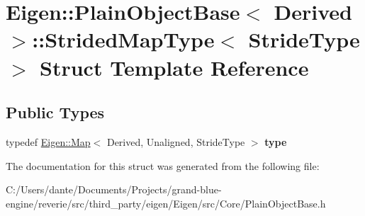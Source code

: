 \hypertarget{struct_eigen_1_1_plain_object_base_1_1_strided_map_type}{}\section{Eigen\+::Plain\+Object\+Base$<$ Derived $>$\+::Strided\+Map\+Type$<$ Stride\+Type $>$ Struct Template Reference}
\label{struct_eigen_1_1_plain_object_base_1_1_strided_map_type}
\subsection*{Public Types}
\begin{DoxyCompactItemize}
\item 
\mbox{\label{struct_eigen_1_1_plain_object_base_1_1_strided_map_type_a63eeb7d4d8aefb9904a7de79f640648e}} 
typedef \mbox{\hyperlink{class_eigen_1_1_map}{Eigen\+::\+Map}}$<$ Derived, Unaligned, Stride\+Type $>$ {\bfseries type}
\end{DoxyCompactItemize}


The documentation for this struct was generated from the following file\+:\begin{DoxyCompactItemize}
\item 
C\+:/\+Users/dante/\+Documents/\+Projects/grand-\/blue-\/engine/reverie/src/third\+\_\+party/eigen/\+Eigen/src/\+Core/Plain\+Object\+Base.\+h\end{DoxyCompactItemize}
